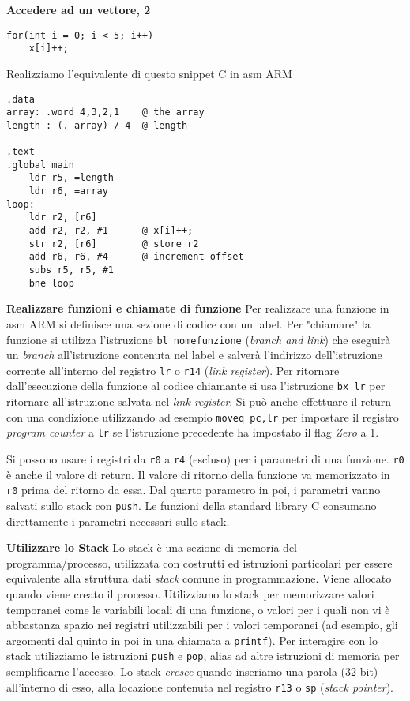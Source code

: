 \begin{exmp}
\textbf{Accedere ad un vettore, 2}
\begin{lstlisting}
for(int i = 0; i < 5; i++)
	x[i]++;
\end{lstlisting}

Realizziamo l'equivalente di questo snippet C in asm ARM


\begin{lstlisting}[style=armn]
.data
array: .word 4,3,2,1    @ the array
length : (.-array) / 4	@ length

.text
.global main
	ldr r5, =length
	ldr r6, =array
loop:
	ldr r2, [r6]
	add r2, r2, #1		@ x[i]++;
	str r2, [r6]		@ store r2
	add r6, r6, #4 		@ increment offset
	subs r5, r5, #1
	bne loop
\end{lstlisting}
\end{exmp}

\begin{exmp}
\textbf{Realizzare funzioni e chiamate di funzione}
Per realizzare una funzione in asm ARM si definisce una sezione di codice
con un label. Per "chiamare" la funzione si utilizza l'istruzione \verb|bl nomefunzione|
(\textit{branch and link}) che eseguirà un \textit{branch} all'istruzione
contenuta nel label e salverà l'indirizzo dell'istruzione corrente all'interno del registro
\verb|lr| o \verb|r14| (\textit{link register}). Per ritornare dall'esecuzione
della funzione al codice chiamante si usa l'istruzione \verb|bx lr| per ritornare
all'istruzione salvata nel \textit{link register}. Si può anche effettuare il return con una
condizione utilizzando ad esempio \verb|moveq pc,lr| per impostare il registro
\textit{program counter} a \verb|lr| se l'istruzione precedente ha impostato il flag
\textit{Zero} a 1.

Si possono usare i registri da \verb|r0| a \verb|r4| (escluso) per i parametri di una funzione.
\verb|r0| è anche il valore di return. Il valore di ritorno della funzione va memorizzato in \verb|r0|
prima del ritorno da essa.
Dal quarto parametro in poi, i parametri vanno salvati sullo stack con \verb|push|.
Le funzioni della standard library C consumano direttamente i parametri necessari sullo stack.
\end{exmp}

\begin{defn}
	\textbf{Utilizzare lo Stack}
	Lo stack è una sezione di memoria del programma/processo, utilizzata con costrutti ed istruzioni
	particolari per essere equivalente alla struttura dati \textit{stack} comune in programmazione. Viene
	allocato quando viene creato il processo. Utilizziamo lo stack per memorizzare
	valori temporanei come le variabili locali di una funzione, o valori per i quali non vi è abbastanza
	spazio nei registri utilizzabili per i valori temporanei (ad esempio, gli argomenti dal quinto in poi in una chiamata a \verb|printf|).
	Per interagire con lo stack utilizziamo le istruzioni \verb|push| e \verb|pop|, alias ad altre istruzioni di memoria per
	semplificarne l'accesso. Lo stack \textit{cresce} quando inseriamo una parola (32 bit) all'interno di esso, alla locazione
	contenuta nel registro \verb|r13| o \verb|sp| (\textit{stack pointer}).
\end{defn}


